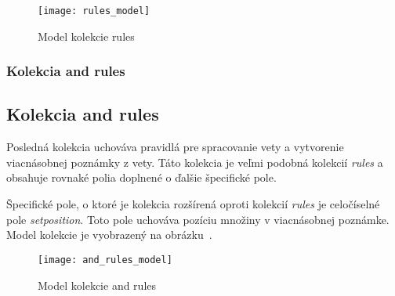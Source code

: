 \begin{figure}[H]
	\begin{center}\texttt{[image: rules\_model]}\end{center}
	\caption[Model kolekcie rules]{Model kolekcie rules}\label{fig:rules_collection_model}
\end{figure}

%
%
{
	\subsubsection{Kolekcia and rules}
}
{
	\subsection{Kolekcia and rules}
}
\label{subsubsection:collection_and_rules}
Posledná kolekcia uchováva pravidlá pre spracovanie vety a vytvorenie viacnásobnej poznámky z vety. Táto kolekcia je veľmi podobná kolekcií \textit{rules} a obsahuje rovnaké polia doplnené o ďalšie špecifické pole.

Špecifické pole, o ktoré je kolekcia rozšírená oproti kolekcií \textit{rules} je celočíselné pole \textit{set\textunderscore position}. Toto pole uchováva pozíciu množiny v viacnásobnej poznámke. Model kolekcie je vyobrazený na obrázku~.

\begin{figure}[H]
	\begin{center}\texttt{[image: and\_rules\_model]}\end{center}
	\caption[Model kolekcie and rules]{Model kolekcie and rules}\label{fig:and_rules_collection_model}
\end{figure}


